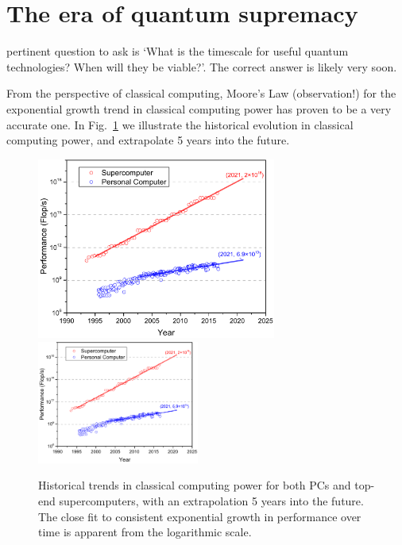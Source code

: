 \section{The era of quantum supremacy} \label{sec:era_quant} 

\newline

 pertinent question to ask is `What is the timescale for useful quantum technologies? When will they be viable?'. The correct answer is likely very soon.

From the perspective of classical computing, Moore's Law (observation!) for the exponential growth trend in classical computing power has proven to be a very accurate one. In Fig.~\ref{fig:moores_law} we illustrate the historical evolution in classical computing power, and extrapolate 5 years into the future.

\begin{figure}[!htbp]
\pubmode
\includegraphics[clip=true, width=0.7\textwidth]{moores_law}
\else
\includegraphics[clip=true, width=0.475\textwidth]{moores_law}
\fi
\captionspacefig \caption{Historical trends in classical computing power for both PCs and top-end supercomputers, with an extrapolation 5 years into the future. The close fit to consistent exponential growth in performance over time is apparent from the logarithmic scale.} \label{fig:moores_law}
\end{figure}

